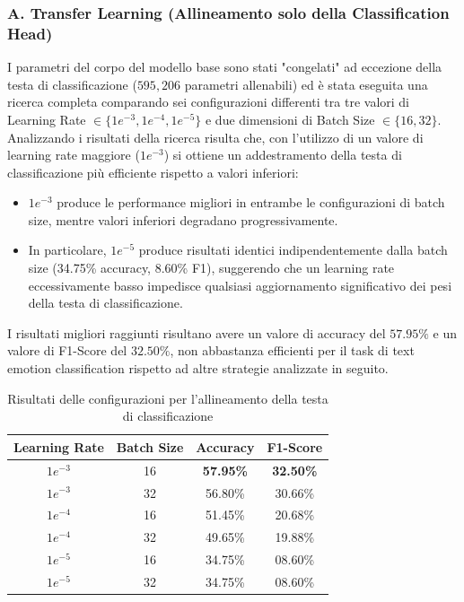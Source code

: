 \documentclass[a4paper,12pt]{article}
\begin{document}
\subsubsection*{A. Transfer Learning (Allineamento solo della Classification Head)}
I parametri del corpo del modello base sono stati "congelati" ad eccezione della testa di classificazione ($595,206$ parametri allenabili) ed è stata eseguita una ricerca completa comparando sei configurazioni differenti tra tre valori di Learning Rate $\in \{1e^{-3}, 1e^{-4}, 1e^{-5}\}$ e due dimensioni di Batch Size $\in \{16, 32\}$.
Analizzando i risultati della ricerca risulta che, con l'utilizzo di un valore di learning rate maggiore ($1e^{-3}$) si ottiene un addestramento della testa di classificazione più efficiente rispetto a valori inferiori:
\begin{itemize}
    \item $1e^{-3}$ produce le performance migliori in entrambe le configurazioni di batch size, mentre valori inferiori degradano progressivamente.
    \item In particolare, $1e^{-5}$ produce risultati identici indipendentemente dalla batch size (34.75\% accuracy, 8.60\% F1), suggerendo che un learning rate eccessivamente basso impedisce qualsiasi aggiornamento significativo dei pesi della testa di classificazione.
\end{itemize}
I risultati migliori raggiunti risultano avere un valore di accuracy del $57.95\%$ e un valore di F1-Score del $32.50\%$, non abbastanza efficienti per il task di text emotion classification rispetto ad altre strategie analizzate in seguito.

\begin{table}[H]
    \centering
    \begin{tabular}{|c|c|c|c|}
        \hline
        \textbf{Learning Rate} & \textbf{Batch Size} & \textbf{Accuracy} & \textbf{F1-Score} \\
        \hline
        $1e^{-3}$              & 16                  & \textbf{57.95\%}  & \textbf{32.50\%}  \\
        $1e^{-3}$              & 32                  & 56.80\%           & 30.66\%           \\
        $1e^{-4}$              & 16                  & 51.45\%           & 20.68\%           \\
        $1e^{-4}$              & 32                  & 49.65\%           & 19.88\%           \\
        $1e^{-5}$              & 16                  & 34.75\%           & 08.60\%           \\
        $1e^{-5}$              & 32                  & 34.75\%           & 08.60\%           \\
        \hline
    \end{tabular}
    \caption{Risultati delle configurazioni per l'allineamento della testa di classificazione}
\end{table}
\end{document}
